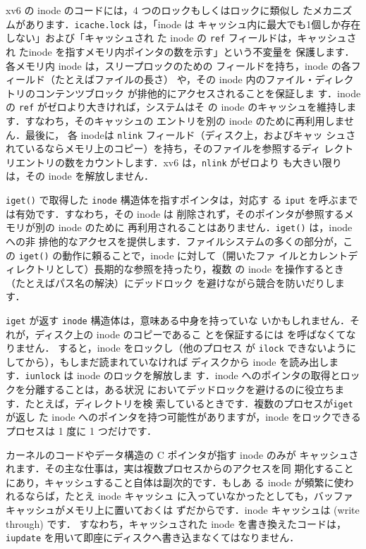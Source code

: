 xv6 の inode のコードには，4 つのロックもしくはロックに類似し
たメカニズムがあります．\texttt{icache.lock} は，「inode は
キャッシュ内に最大でも1個しか存在しない」および「キャッシュされ
た inode の \texttt{ref} フィールドは，キャッシュされ
たinode を指すメモリ内ポインタの数を示す」という不変量を
保護します．各メモリ内 inode は，スリープロックのための
フィールドを持ち，inode の各フィールド（たとえばファイルの長さ）
や，その inode 内のファイル・ディレクトリのコンテンツブロック
が排他的にアクセスされることを保証しま
す．inode の \texttt{ref} がゼロより大きければ，システムはそ
の inode のキャッシュを維持します．すなわち，そのキャッシュの
エントリを別の inode のために再利用しません．最後に，
各 inodeは \texttt{nlink} フィールド（ディスク上，およびキャッ
シュされているならメモリ上のコピー）を持ち，そのファイルを参照するディ
レクトリエントリの数をカウントします．xv6 は，\texttt{nlink} がゼロより
も大きい限りは，その inode を解放しません．　

\texttt{iget()} で取得した \texttt{inode} 構造体を指すポインタは，対応す
る \texttt{iput} を呼ぶまでは有効です．すなわち，その inode は
削除されず，そのポインタが参照するメモリが別の inode のために
再利用されることはありません．\texttt{iget()} は，inode への非
排他的なアクセスを提供します．ファイルシステムの多くの部分が，こ
の \texttt{iget()} の動作に頼ることで，inode に対して（開いたファ
イルとカレントディレクトリとして）長期的な参照を持ったり，複数
の inode を操作するとき（たとえばパス名の解決）にデッドロック
を避けながら競合を防いだりします．

\texttt{iget} が返す \texttt{inode} 構造体は，意味ある中身を持っていな
いかもしれません．それが，ディスク上の inode のコピーであるこ
とを保証するには  を呼ばなくてなりません．
すると，inode をロックし（他のプロセス
が \texttt{ilock} できないようにしてから），もしまだ読まれていなければ
ディスクから inode を読み出しま
す．\texttt{iunlock} は inode のロックを解放しま
す．inode へのポインタの取得とロックを分離することは，ある状況
においてデッドロックを避けるのに役立ちます．たとえば，ディレクトリを検
索しているときです．複数のプロセスが\texttt{iget} が返し
た inode へのポインタを持つ可能性がありますが，inode
をロックできるプロセスは 1 度に 1 つだけです．

カーネルのコードやデータ構造の C ポインタが指す inode のみが
キャッシュされます．その主な仕事は，実は複数プロセスからのアクセスを同
期化することにあり，キャッシュすること自体は副次的です．もしあ
る inode が頻繁に使われるならば，たとえ inode キャッシュ
に入っていなかったとしても，バッファキャッシュがメモリ上に置いておくは
ずだからです．inode キャッシュは (write through) です．
すなわち，キャッシュされた inode を書き換えたコードは，
\texttt{iupdate} を用いて即座にディスクへ書き込まなくてはなりません．

